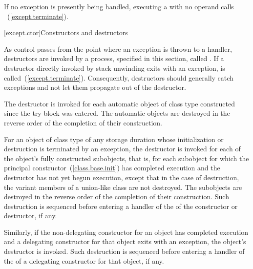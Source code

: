 \pnum
{}%
%
%
If no exception is presently being handled,
executing a
with no operand calls
~(\ref{except.terminate}).


[except.ctor]{Constructors and destructors}%
%
%
%

\pnum
{}%
As control passes from the point where an exception is thrown
to a handler,
destructors are invoked by a process, specified in this section, called
. If a destructor directly invoked by stack unwinding
exits with an exception,  is called~(\ref{except.terminate}).
\enternote
Consequently, destructors should generally catch exceptions and not let them
propagate out of the destructor.
\exitnote

\pnum
The destructor is invoked for each automatic object of class type constructed
since the try block was entered.
The automatic objects are destroyed in the reverse order of the completion
of their construction.

\pnum
For an object of class type
of any storage duration whose initialization or destruction is terminated by an exception,
the destructor is invoked for each of the object's fully constructed
subobjects,
that is, for each subobject for which the principal
constructor~(\ref{class.base.init}) has completed execution
and the destructor has not yet begun execution,
except that in the case of destruction, the variant members of a
union-like class are not destroyed.
The subobjects are destroyed in the reverse order of the completion of
their construction. Such destruction is sequenced before entering a
handler of the  of the constructor or destructor,
if any.

\pnum
Similarly, if the non-delegating constructor for an object has
completed execution and a delegating constructor for that object exits with
an exception, the object's destructor is invoked.
Such destruction is sequenced before entering a handler of the
 of a delegating constructor for that object, if any.

